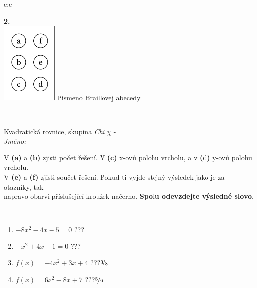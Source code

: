 \documentclass[10pt]{report}
\begin{document}
\begin{tabular}{c:c}
\begin{minipage}[c][104.5mm][t]{0.5\linewidth}
\begin{center}
\begin{minipage}{0.20\linewidth}
\begin{center}
{\Huge\bfseries 2.} \\[2mm]
\includegraphics[height=40mm]{../images/braille.png}
{\small Písmeno Braillovej abecedy}
\end{center}
\end{minipage}
\end{center}
\end{minipage}
\\ \hdashline
\begin{minipage}[c][104.5mm][t]{0.5\linewidth}
\begin{center}
\vspace{7mm}
{\huge Kvadratická rovnice, skupina \textit{Chi $\chi$} -}\\[5mm]
\textit{Jméno:}\phantom{xxxxxxxxxxxxxxxxxxxxxxxxxxxxxxxxxxxxxxxxxxxxxxxxxxxxxxxxxxxxxxxxx}\\[5mm]
\begin{minipage}{0.95\linewidth}
\begin{center}
V \textbf{(a)} a \textbf{(b)} zjisti počet řešení. V \textbf{(c)} x-ovú polohu vrcholu, a v \textbf{(d)} y-ovú polohu vrcholu.\\V \textbf{(e)} a \textbf{(f)} zjisti součet řešení. Pokud ti vyjde stejný výsledek jako je za otazníky, tak\\napravo obarvi příslušející kroužek načerno. \textbf{Spolu odevzdejte výsledné slovo}.
\end{center}
\end{minipage}
\\[1mm]
\begin{minipage}{0.79\linewidth}
\begin{center}
\begin{varwidth}{\linewidth}
\begin{enumerate}
\Large
\item $-8x^2-4x-5=0$\quad \dotfill\; ???\;\dotfill {}
\item $-x^2+4x-1=0$\quad \dotfill\; ???\;\dotfill {}
\item $f(x)=-4x^2+3x+4$\quad \dotfill\; ???\;\dotfill \quad $\nicefrac{3}{8}$
\item $f(x)=6x^2-8x+7$\quad \dotfill\; ???\;\dotfill \quad $\nicefrac{5}{6}$

\end{enumerate}
\end{varwidth}
\end{center}
\end{minipage}
\end{center}
\end{minipage}
\end{tabular}
\end{document}
